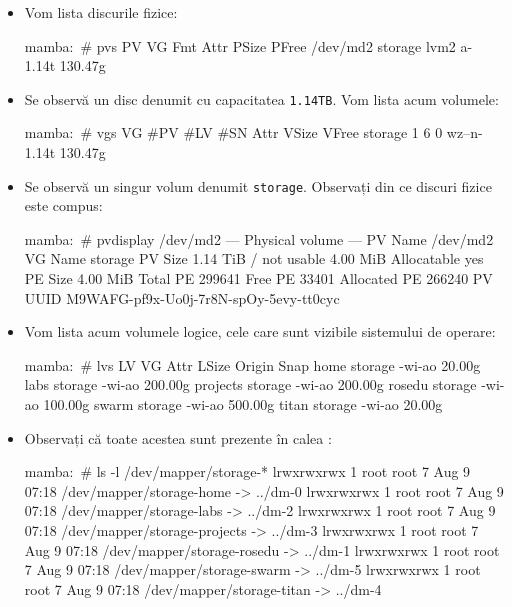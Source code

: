 \begin{itemize}
  \item Vom lista discurile fizice:

\begin{screen}
mamba:~# pvs
  PV         VG      Fmt  Attr PSize PFree
  /dev/md2   storage lvm2 a-   1.14t 130.47g
\end{screen}

  \item Se observă un disc denumit  cu capacitatea \texttt{1.14TB}.
    Vom lista acum volumele:

\begin{screen}
mamba:~# vgs
  VG      #PV #LV #SN Attr   VSize VFree
  storage   1   6   0 wz--n- 1.14t 130.47g
\end{screen}

  \item Se observă un singur volum denumit \texttt{storage}.
    Observați din ce discuri fizice este compus:

\begin{screen}
mamba:~# pvdisplay /dev/md2
  --- Physical volume ---
  PV Name               /dev/md2
  VG Name               storage
  PV Size               1.14 TiB / not usable 4.00 MiB
  Allocatable           yes
  PE Size               4.00 MiB
  Total PE              299641
  Free PE               33401
  Allocated PE          266240
  PV UUID               M9WAFG-pf9x-Uo0j-7r8N-spOy-5evy-tt0cyc
\end{screen}

  \item Vom lista acum volumele logice, cele care sunt vizibile sistemului de operare:

\begin{screen}
mamba:~# lvs
  LV       VG      Attr   LSize   Origin Snap%
  home     storage -wi-ao  20.00g
  labs     storage -wi-ao 200.00g
  projects storage -wi-ao 200.00g
  rosedu   storage -wi-ao 100.00g
  swarm    storage -wi-ao 500.00g
  titan    storage -wi-ao  20.00g
\end{screen}


  \item Observați că toate acestea sunt prezente în calea :

\begin{screen}
mamba:~# ls -l /dev/mapper/storage-*
lrwxrwxrwx 1 root root 7 Aug  9 07:18 /dev/mapper/storage-home -> ../dm-0
lrwxrwxrwx 1 root root 7 Aug  9 07:18 /dev/mapper/storage-labs -> ../dm-2
lrwxrwxrwx 1 root root 7 Aug  9 07:18 /dev/mapper/storage-projects -> ../dm-3
lrwxrwxrwx 1 root root 7 Aug  9 07:18 /dev/mapper/storage-rosedu -> ../dm-1
lrwxrwxrwx 1 root root 7 Aug  9 07:18 /dev/mapper/storage-swarm -> ../dm-5
lrwxrwxrwx 1 root root 7 Aug  9 07:18 /dev/mapper/storage-titan -> ../dm-4
\end{screen}

\end{itemize}

